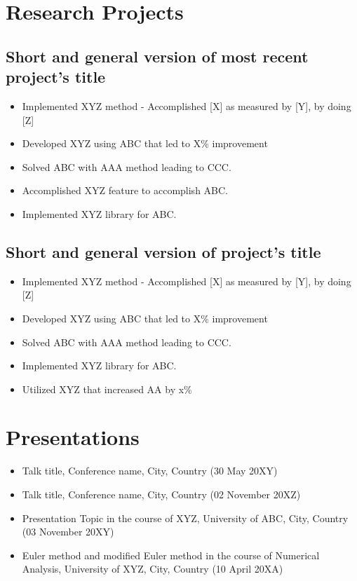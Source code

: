 \documentclass[11pt]{article}
\begin{document}
\section{Research Projects}
\subsection{Short and general version of most recent project's title} %
\begin{itemize}
    \item[\checkmark] Implemented XYZ method - Accomplished [X] as measured by [Y], by doing [Z] 
    \item[\checkmark] Developed XYZ using ABC that led to X\% improvement 
    \item[\checkmark] Solved ABC with AAA method leading to CCC.
    \item[\checkmark] Accomplished XYZ feature to accomplish ABC.
    \item[\checkmark] Implemented XYZ library for ABC.
\end{itemize}
\subsection{Short and general version of project's title} %
\begin{itemize}
    \item[\checkmark] Implemented XYZ method - Accomplished [X] as measured by [Y], by doing [Z] 
    \item[\checkmark] Developed XYZ using ABC that led to X\% improvement 
    \item[\checkmark] Solved ABC with AAA method leading to CCC.
    \item[\checkmark] Implemented XYZ library for ABC.
    \item[\checkmark] Utilized XYZ that increased AA by x\%
\end{itemize}
\section{Presentations}
\begin{itemize}
    \item[\checkmark] Talk title, Conference name, City, Country (30 May 20XY)
    \item[\checkmark] Talk title, Conference name, City, Country (02 November 20XZ)
    \item[\checkmark] Presentation Topic in the course of XYZ, University of ABC, City, Country (03 November 20XY)
    \item[\checkmark] Euler method and modified Euler method in the course of Numerical Analysis, University of XYZ, City, Country (10 April 20XA)
\end{itemize}
\end{document}
